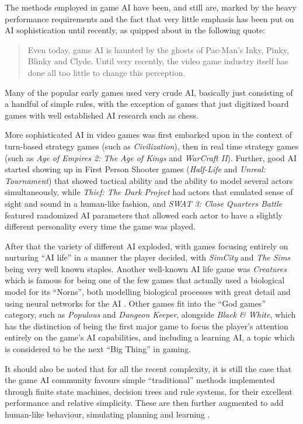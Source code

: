 The methods employed in game AI have been, and still are,
marked by the heavy performance requirements and the fact that very little
emphasis has been put on AI sophistication until recently, as quipped about in
the following quote:

\begin{quote}
  Even today, game AI is haunted by the ghosts of Pac-Man's Inky, Pinky, Blinky
  and Clyde. Until very recently, the video game industry itself has done all
  too little to change this perception.
\end{quote}

Many of the popular early games used very crude AI, basically just consisting of
a handful of simple rules, with the exception of games that just digitized board
games with well established AI research such as chess.

More sophisticated AI in video games was first embarked upon in the context of
turn-based strategy games (such as \emph{Civilization}), then in real time
strategy games (such as \emph{Age of Empires 2: The Age of Kings} and
\emph{WarCraft II}). Further, good AI started showing up in First Person Shooter
games (\emph{Half-Life} and \emph{Unreal: Tournament}) that showed tactical
ability and the ability to model several actors simultaneously, while
\emph{Thief: The Dark Project} had actors that emulated sense of sight and sound
in a human-like fashion, and \emph{SWAT 3: Close Quarters Battle} featured
randomized AI parameters that allowed each actor to have a slightly different
personality every time the game was played.

After that the variety of different AI exploded, with games focusing entirely on
nurturing ``AI life'' in a manner the player decided, with \emph{SimCity} and
\emph{The Sims} being very well known staples. Another well-known AI life game
was \emph{Creatures} which is famous for being one of the few games that
actually used a biological model for its ``Norns'', both modelling biological
processes with great detail and using neural networks for the AI
\citep[see][]{grand1997creatures}. Other games fit into the ``God games''
category, such as \emph{Populous} and \emph{Dungeon Keeper}, alongside
\emph{Black \& White}, which has the distinction of being the first major game
to focus the player's attention entirely on the game's AI capabilities, and
including a learning AI, a topic which is considered to be the next ``Big
Thing'' in gaming.

It should also be noted that for all the recent complexity, it is still the case
that the game AI community favours simple ``traditional'' methods implemented
through finite state machines, decision trees and rule systems, for their
excellent performance and relative simplicity. These are then further augmented
to add human-like behaviour, simulating planning and learning
\citep[see][]{orkin2003applying,isla2002new,khoo2002efficient,mateas2002behavior}.

